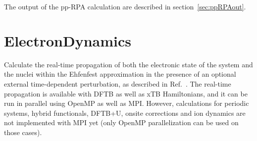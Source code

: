 The output of the pp-RPA calculation are described in
section~\ref{sec:ppRPAout}.


\section{ElectronDynamics}

\label{sec:dftbp.ElectronDynamics}

Calculate the real-time propagation of both the electronic state of the system
and the nuclei within the Ehfenfest approximation in the presence of an optional
external time-dependent perturbation, as described in Ref.~\cite{realtime1}.
The real-time propagation is available with DFTB as well as xTB Hamiltonians, and it can be run in parallel using OpenMP as well as MPI. However, calculations for periodic systems, hybrid functionals, DFTB+U, onsite corrections and ion dynamics are not implemented with MPI yet (only OpenMP parallelization can be used on those cases).

